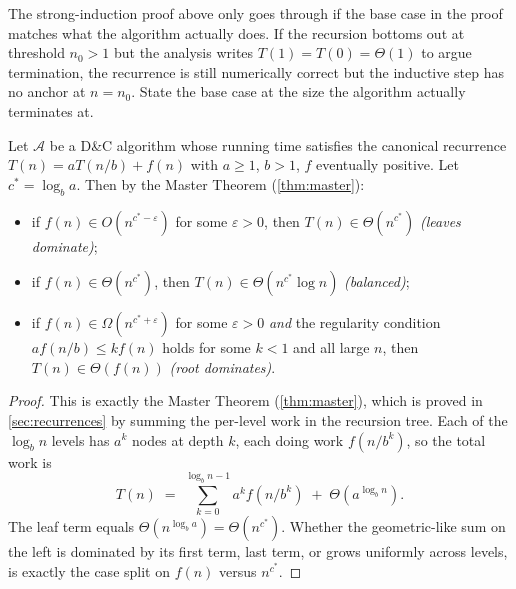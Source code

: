 \begin{remark}
The strong-induction proof above only goes through if the base case in the proof matches what the algorithm actually does. If the recursion bottoms out at threshold $n_0 > 1$ but the analysis writes $T(1) = T(0) = \Theta(1)$ to argue termination, the recurrence is still numerically correct but the inductive step has no anchor at $n = n_0$. State the base case at the size the algorithm actually terminates at.
\end{remark}

\begin{proposition}
\label{prop:dnc_complexity}
Let $\mathcal{A}$ be a D\&C algorithm whose running time satisfies the canonical recurrence $T(n) = a T(n/b) + f(n)$ with $a \ge 1$, $b > 1$, $f$ eventually positive. Let $c^* = \log_b a$. Then by the Master Theorem (\cref{thm:master}):
\begin{itemize}
  \item if $f(n) \in O(n^{c^* - \varepsilon})$ for some $\varepsilon > 0$, then $T(n) \in \Theta(n^{c^*})$ \emph{(leaves dominate)};
  \item if $f(n) \in \Theta(n^{c^*})$, then $T(n) \in \Theta(n^{c^*} \log n)$ \emph{(balanced)};
  \item if $f(n) \in \Omega(n^{c^* + \varepsilon})$ for some $\varepsilon > 0$ \emph{and} the regularity condition $a f(n/b) \le k f(n)$ holds for some $k < 1$ and all large $n$, then $T(n) \in \Theta(f(n))$ \emph{(root dominates)}.
\end{itemize}
\end{proposition}

\begin{proof}
\sketchproof This is exactly the Master Theorem (\cref{thm:master}), which is proved in \cref{sec:recurrences} by summing the per-level work in the recursion tree. Each of the $\log_b n$ levels has $a^k$ nodes at depth $k$, each doing work $f(n/b^k)$, so the total work is
\[
  T(n) \;=\; \sum_{k=0}^{\log_b n - 1} a^k f(n/b^k) \;+\; \Theta(a^{\log_b n}).
\]
The leaf term equals $\Theta(n^{\log_b a}) = \Theta(n^{c^*})$. Whether the geometric-like sum on the left is dominated by its first term, last term, or grows uniformly across levels, is exactly the case split on $f(n)$ versus $n^{c^*}$.
\end{proof}

